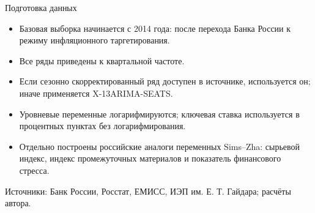\begin{frame}{Подготовка данных}

\begin{itemize}
    \item Базовая выборка начинается с 2014 года: после перехода Банка России
    к режиму инфляционного таргетирования.

    \item Все ряды приведены к квартальной частоте.

    \item Если сезонно скорректированный ряд доступен в источнике, используется он;
    иначе применяется X-13ARIMA-SEATS.

    \item Уровневые переменные логарифмируются; ключевая ставка используется
    в процентных пунктах без логарифмирования.

    \item Отдельно построены российские аналоги переменных Sims--Zha:
    сырьевой индекс, индекс промежуточных материалов и показатель финансового стресса.
\end{itemize}

\vspace{0.2cm}

{\scriptsize Источники: Банк России, Росстат, ЕМИСС, ИЭП им. Е. Т. Гайдара; расчёты автора.}

\end{frame}